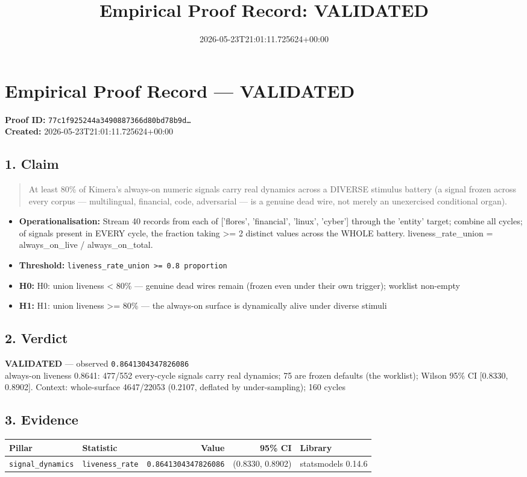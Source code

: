 \documentclass{article}
\title{Empirical Proof Record: VALIDATED}
\date{2026-05-23T21:01:11.725624+00:00}
\begin{document}
\maketitle
\section*{Empirical Proof Record --- \textcolor{validated}{\textbf{VALIDATED}}}
\textbf{Proof ID:} \texttt{77c1f925244a3490887366d80bd78b9d\dots}\\
\textbf{Created:} 2026-05-23T21:01:11.725624+00:00
\subsection*{1. Claim}
\begin{quote}At least 80\% of Kimera's always-on numeric signals carry real dynamics across a DIVERSE stimulus battery (a signal frozen across every corpus — multilingual, financial, code, adversarial — is a genuine dead wire, not merely an unexercised conditional organ).\end{quote}
\begin{itemize}
\item \textbf{Operationalisation:} Stream 40 records from each of ['flores', 'financial', 'linux', 'cyber'] through the 'entity' target; combine all cycles; of signals present in EVERY cycle, the fraction taking >= 2 distinct values across the WHOLE battery. liveness\_rate\_union = always\_on\_live / always\_on\_total.
\item \textbf{Threshold:} \texttt{liveness\_rate\_union >= 0.8 proportion}
\item \textbf{H0:} H0: union liveness < 80\% — genuine dead wires remain (frozen even under their own trigger); worklist non-empty
\item \textbf{H1:} H1: union liveness >= 80\% — the always-on surface is dynamically alive under diverse stimuli
\end{itemize}
\subsection*{2. Verdict}
\textcolor{validated}{\textbf{VALIDATED}} --- observed \texttt{0.8641304347826086}\\
always-on liveness 0.8641: 477/552 every-cycle signals carry real dynamics; 75 are frozen defaults (the worklist); Wilson 95\% CI [0.8330, 0.8902]. Context: whole-surface 4647/22053 (0.2107, deflated by under-sampling); 160 cycles
\subsection*{3. Evidence}
\begin{tabular}{llrrl}\toprule
\textbf{Pillar} & \textbf{Statistic} & \textbf{Value} & \textbf{95\% CI} & \textbf{Library} \\\midrule
\texttt{signal\_dynamics} & \texttt{liveness\_rate} & \texttt{0.8641304347826086} & (0.8330, 0.8902) & statsmodels 0.14.6 \\
\bottomrule\end{tabular}
\end{document}
